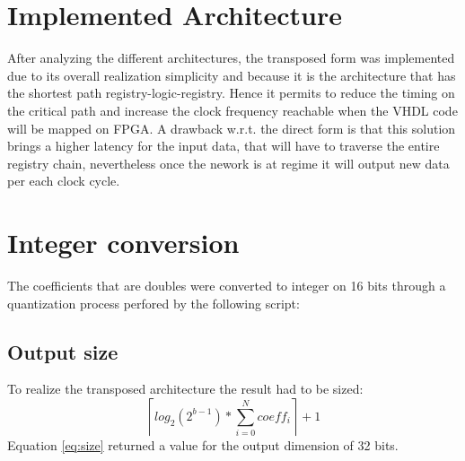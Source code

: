 \section{Implemented Architecture}
After analyzing the different architectures, the transposed form was implemented due to its overall realization simplicity and because it is the architecture that has the shortest path registry-logic-registry. Hence it permits to reduce the timing on the critical path and increase the clock frequency reachable when the VHDL code will be mapped on FPGA. A drawback w.r.t. the direct form is that this solution brings a higher latency for the input data, that will have to traverse the entire registry chain, nevertheless once the nework is at regime it will output new data per each clock cycle.
\section{Integer conversion}
The coefficients that are doubles were converted to integer on 16 bits through a quantization process perfored by the following script:

\subsection{Output size}
\label{sec:sizing}
To realize the transposed architecture the result had to be sized:
\begin{equation}
	\label{eq:size}
	\left \lceil log_2(2^{b-1})*\sum_{i=0}^{N} coeff_i\right \rceil	+1
\end{equation}
Equation \ref{eq:size} returned a value for the output dimension of 32 bits.